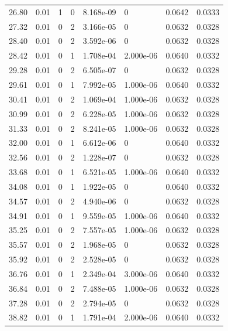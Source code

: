 \documentclass[preview]{standalone}
\begin{document}
{{{\begin{tabular}{L{1.2cm}C{1.2cm} C{0.3cm}C{0.5cm} C{1.4cm}C{1.4cm} C{1.4cm}C{1.4cm}}
  26.80  &  0.01  & 1     &  0 &  8.168e-09  & 0  & 0.0642 &  0.0333   \\ 
  27.32  &  0.01  & 0     &  2 &  3.166e-05  & 0  & 0.0632 &  0.0328   \\ 
  28.40  &  0.01  & 0     &  2 &  3.592e-06  & 0  & 0.0632 &  0.0328   \\ 
  28.42  &  0.01  & 0     &  1 &  1.708e-04  & 2.000e-06  & 0.0640 &  0.0332   \\ 
  29.28  &  0.01  & 0     &  2 &  6.505e-07  & 0  & 0.0632 &  0.0328   \\ 
  29.61  &  0.01  & 0     &  1 &  7.992e-05  & 1.000e-06  & 0.0640 &  0.0332   \\ 
  30.41  &  0.01  & 0     &  2 &  1.069e-04  & 1.000e-06  & 0.0632 &  0.0328   \\ 
  30.99  &  0.01  & 0     &  2 &  6.228e-05  & 1.000e-06  & 0.0632 &  0.0328   \\ 
  31.33  &  0.01  & 0     &  2 &  8.241e-05  & 1.000e-06  & 0.0632 &  0.0328   \\ 
  32.00  &  0.01  & 0     &  1 &  6.612e-06  & 0  & 0.0640 &  0.0332   \\ 
  32.56  &  0.01  & 0     &  2 &  1.228e-07  & 0  & 0.0632 &  0.0328   \\ 
  33.68  &  0.01  & 0     &  1 &  6.521e-05  & 1.000e-06  & 0.0640 &  0.0332   \\ 
  34.08  &  0.01  & 0     &  1 &  1.922e-05  & 0  & 0.0640 &  0.0332   \\ 
  34.57  &  0.01  & 0     &  2 &  4.940e-06  & 0  & 0.0632 &  0.0328   \\ 
  34.91  &  0.01  & 0     &  1 &  9.559e-05  & 1.000e-06  & 0.0640 &  0.0332   \\ 
  35.25  &  0.01  & 0     &  2 &  7.557e-05  & 1.000e-06  & 0.0632 &  0.0328   \\ 
  35.57  &  0.01  & 0     &  2 &  1.968e-05  & 0  & 0.0632 &  0.0328   \\ 
  35.92  &  0.01  & 0     &  2 &  2.528e-05  & 0  & 0.0632 &  0.0328   \\ 
  36.76  &  0.01  & 0     &  1 &  2.349e-04  & 3.000e-06  & 0.0640 &  0.0332   \\ 
  36.84  &  0.01  & 0     &  2 &  7.488e-05  & 1.000e-06  & 0.0632 &  0.0328   \\ 
  37.28  &  0.01  & 0     &  2 &  2.794e-05  & 0  & 0.0632 &  0.0328   \\ 
  38.82  &  0.01  & 0     &  1 &  1.791e-04  & 2.000e-06  & 0.0640 &  0.0332   \\ 

\end{tabular}}}}
\end{document}
